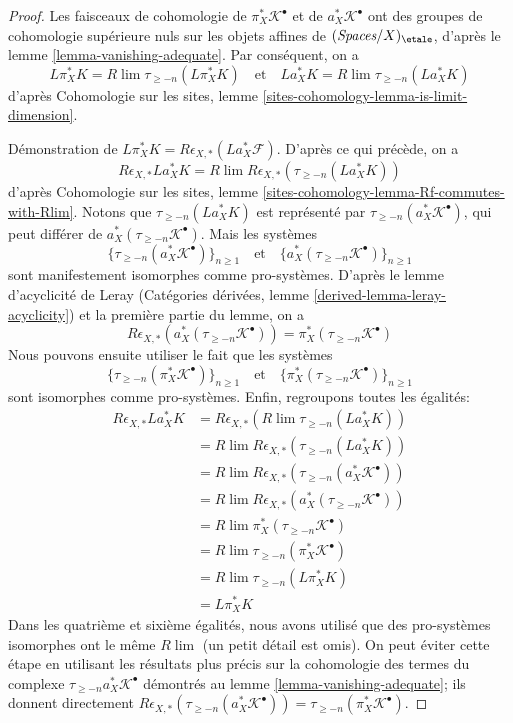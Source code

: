 \begin{proof}
\medskip\noindent
Les faisceaux de cohomologie de $\pi_X^*\mathcal{K}^\bullet$ et de
$a_X^*\mathcal{K}^\bullet$ ont des groupes de cohomologie supérieure nuls sur
les objets affines de $(\textit{Spaces}/X)_\etale$, d'après le lemme
\ref{lemma-vanishing-adequate}. Par conséquent, on a
$$
L\pi_X^*K = R\lim \tau_{\geq -n}(L\pi_X^*K)
\quad\text{et}\quad
La_X^*K = R\lim \tau_{\geq -n}(La_X^*K)
$$
d'après Cohomologie sur les sites, lemme
\ref{sites-cohomology-lemma-is-limit-dimension}.

\medskip\noindent
Démonstration de $L\pi_X^*K = R\epsilon_{X, *}(La_X^*\mathcal{F})$.
D'après ce qui précède, on a
$$
R\epsilon_{X, *}La_X^*K =
R\lim R\epsilon_{X, *}(\tau_{\geq -n}(La_X^*K))
$$
d'après Cohomologie sur les sites, lemme
\ref{sites-cohomology-lemma-Rf-commutes-with-Rlim}.
Notons que $\tau_{\geq -n}(La_X^*K)$ est représenté par
$\tau_{\geq -n}(a_X^*\mathcal{K}^\bullet)$, qui peut différer de
$a_X^*(\tau_{\geq -n}\mathcal{K}^\bullet)$.
Mais les systèmes
$$
\{\tau_{\geq -n}(a_X^*\mathcal{K}^\bullet)\}_{n \geq 1}
\quad\text{et}\quad
\{a_X^*(\tau_{\geq -n}\mathcal{K}^\bullet)\}_{n \geq 1}
$$
sont manifestement isomorphes comme pro-systèmes.
D'après le lemme d'acyclicité de Leray (Catégories dérivées, lemme
\ref{derived-lemma-leray-acyclicity}) et la première partie du lemme, on a
$$
R\epsilon_{X, *}(a_X^*(\tau_{\geq -n}\mathcal{K}^\bullet)) =
\pi_X^*(\tau_{\geq -n}\mathcal{K}^\bullet)
$$
Nous pouvons ensuite utiliser le fait que les systèmes
$$
\{\tau_{\geq -n}(\pi_X^*\mathcal{K}^\bullet)\}_{n \geq 1}
\quad\text{et}\quad
\{\pi_X^*(\tau_{\geq -n}\mathcal{K}^\bullet)\}_{n \geq 1}
$$
sont isomorphes comme pro-systèmes. Enfin, regroupons toutes les égalités:
\begin{align*}
R\epsilon_{X, *}La_X^*K
& =
R\epsilon_{X, *} (R\lim \tau_{\geq -n}(La_X^*K)) \\
& =
R\lim R\epsilon_{X, *}(\tau_{\geq -n}(La_X^*K)) \\
& =
R\lim R\epsilon_{X, *}(\tau_{\geq -n}(a_X^*\mathcal{K}^\bullet)) \\
& =
R\lim R\epsilon_{X, *}(a_X^*(\tau_{\geq -n}\mathcal{K}^\bullet)) \\
& =
R\lim \pi_X^*(\tau_{\geq -n}\mathcal{K}^\bullet) \\
& =
R\lim \tau_{\geq -n}(\pi_X^*\mathcal{K}^\bullet) \\
& =
R\lim \tau_{\geq -n}(L\pi_X^*K) \\
& =
L\pi_X^*K
\end{align*}
Dans les quatrième et sixième égalités, nous avons utilisé que des pro-systèmes
isomorphes ont le même $R\lim$ (un petit détail est omis).
On peut éviter cette étape en utilisant les résultats plus précis sur la
cohomologie des termes du complexe $\tau_{\geq -n}a_X^*\mathcal{K}^\bullet$
démontrés au lemme \ref{lemma-vanishing-adequate}; ils donnent directement
$R\epsilon_{X, *}(\tau_{\geq -n}(a_X^*\mathcal{K}^\bullet)) =
\tau_{\geq -n}(\pi_X^*\mathcal{K}^\bullet)$.


\end{proof}
